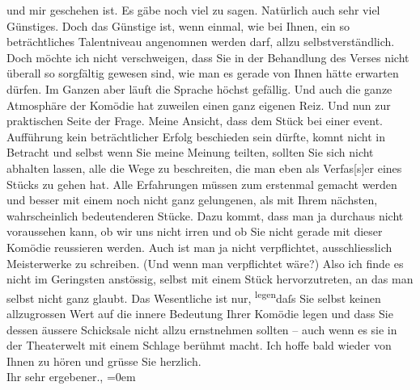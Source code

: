 \begin{ledgroupsized}[t]{13cm}
               und mir geschehen ist. Es gäbe noch viel zu sagen. Natürlich auch sehr viel
               Günstiges. Doch das Günstige ist, wenn einmal, wie bei Ihnen, ein so beträchtliches
               Talentniveau angenomnen werden darf, allzu selbstverständlich. Doch möchte ich nicht
               verschweigen, dass Sie in der Behandlung des Verses nicht überall so sorgfältig
               gewesen sind, wie man es gerade von Ihnen hätte erwarten dürfen. Im Ganzen aber läuft
               die Sprache höchst gefällig. Und auch die ganze Atmosphäre der Komödie hat zuweilen
               einen ganz eigenen Reiz.\pend
           \pstart
           Und nun zur praktischen Seite der Frage. Meine Ansicht, dass dem Stück bei einer event. Aufführung kein
               beträchtlicher Erfolg beschieden sein dürfte, komnt nicht in Betracht und selbst wenn
               Sie meine Meinung teilten, sollten Sie sich nicht abhalten lassen, alle die Wege zu
               beschreiten, die man eben als Verfas{[}s{]}er eines Stücks zu gehen
               hat. Alle Erfahrungen müssen zum {\pb}erstenmal gemacht
               werden und besser mit einem noch nicht ganz gelungenen, als mit Ihrem nächsten,
               wahrscheinlich bedeutenderen Stücke. Dazu kommt, dass man ja durchaus nicht
               voraussehen kann, ob wir uns nicht irren und ob Sie nicht gerade mit dieser Komödie
                  reussieren werden. Auch ist man ja nicht
               verpflichtet, ausschliesslich Meisterwerke zu schreiben. (Und wenn man verpflichtet
               wäre?) Also ich finde es nicht im Geringsten anstössig, selbst mit einem Stück
               hervorzutreten, an das man selbst nicht ganz glaubt. Das Wesentliche ist nur, \substVorne{}\textsuperscript{legen}\substDazwischen{}daſs\substHinten{} Sie selbst keinen allzugrossen Wert auf die innere Bedeutung Ihrer Komödie legen und dass Sie dessen
               äussere Schicksale nicht allzu ernstnehmen sollten – auch wenn es sie in der
               Theaterwelt mit einem Schlage berühmt macht.\pend
           \pstart
           Ich hoffe bald wieder von Ihnen zu hören und grüsse Sie herzlich.{\\[\baselineskip]} Ihr sehr
               ergebener.,\pend
           \leftskip=0em{}
         
         \endnumbering{}\end{ledgroupsized}  \newcommand{\dateiname}{L01635}\newcommand{\titel}{Arthur Schnitzler an Max Mell, 26. 10. 1906}\newcommand{\editorInnen}{Martin Anton Müller und Gerd-Hermann Susen}
      